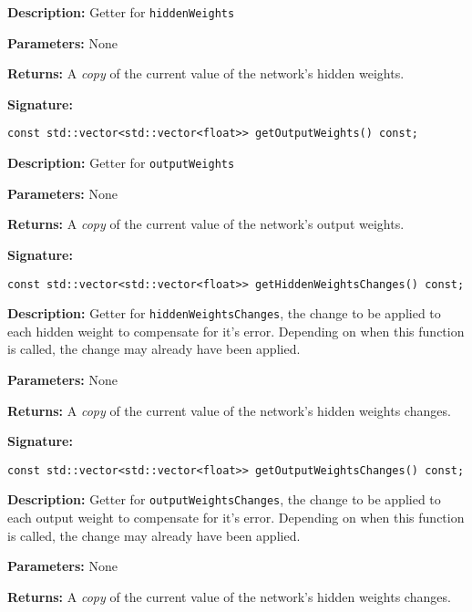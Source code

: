 \documentclass[a4paper]{article}
\begin{document}
\textbf{Description: }
Getter for \lstinline{hiddenWeights}

\textbf{Parameters: } None

\textbf{Returns: }
A \textit{copy} of the current value of the network's hidden weights.

\hrulefill %

\textbf{Signature:} \begin{lstlisting}
const std::vector<std::vector<float>> getOutputWeights() const;
\end{lstlisting}

\textbf{Description: }
Getter for \lstinline{outputWeights}

\textbf{Parameters: } None

\textbf{Returns: }
A \textit{copy} of the current value of the network's output weights.

\hrulefill %

\textbf{Signature:} \begin{lstlisting}
const std::vector<std::vector<float>> getHiddenWeightsChanges() const;
\end{lstlisting}

\textbf{Description: }
Getter for \lstinline{hiddenWeightsChanges}, the change to be applied to each hidden weight to compensate for it's error. Depending on when this function is called, the change may already have been applied.

\textbf{Parameters: } None

\textbf{Returns: }
A \textit{copy} of the current value of the network's hidden weights changes.

\hrulefill %

\textbf{Signature:} \begin{lstlisting}
const std::vector<std::vector<float>> getOutputWeightsChanges() const;
\end{lstlisting}

\textbf{Description: }
Getter for \lstinline{outputWeightsChanges}, the change to be applied to each output weight to compensate for it's error. Depending on when this function is called, the change may already have been applied.

\textbf{Parameters: } None

\textbf{Returns: }
A \textit{copy} of the current value of the network's hidden weights changes.
\end{document}
